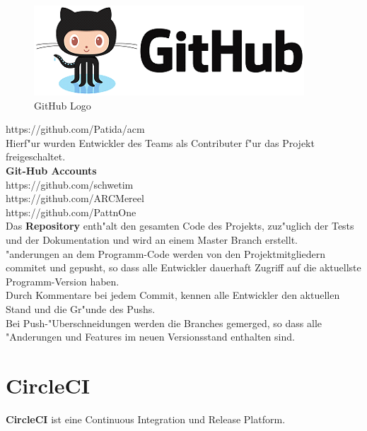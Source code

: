 \documentclass[a4paper, 11pt]{scrreprt}
\begin{document}
\begin{figure} [H]
\begin{center}
\includegraphics[scale=0.7]{github.png}
\caption{GitHub Logo}
\label{github}
\end{center}
\end{figure}

https://github.com/Patida/acm \\

Hierf"ur wurden Entwickler des Teams als Contributer f"ur das Projekt freigeschaltet. \\

\textbf{Git-Hub Accounts} \\
https://github.com/schwetim \\
https://github.com/ARCMereel \\
https://github.com/PattnOne \\


Das \textbf{Repository} enth"alt den gesamten Code des Projekts, zuz"uglich der Tests und der Dokumentation und wird an einem Master Branch erstellt. \\
"anderungen an dem Programm-Code werden von den Projektmitgliedern commitet und gepusht, so dass alle Entwickler dauerhaft Zugriff auf die aktuellste Programm-Version haben. \\

Durch Kommentare bei jedem Commit, kennen alle Entwickler den aktuellen Stand und die Gr"unde des Pushs.  \\
Bei Push-"Uberschneidungen werden die Branches gemerged, so dass alle "Anderungen und Features im neuen Versionsstand enthalten sind. \\


\section{CircleCI}
\textbf{CircleCI} ist eine Continuous Integration und Release Platform. \\
\end{document}
